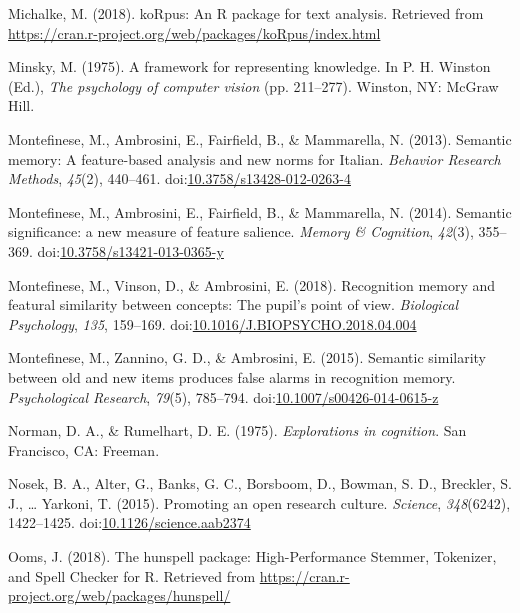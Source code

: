 \documentclass[man]{apa6}
\begin{document}
\leavevmode\hypertarget{ref-Michalke2018}{}%
Michalke, M. (2018). koRpus: An R package for text analysis. Retrieved from \url{https://cran.r-project.org/web/packages/koRpus/index.html}

\leavevmode\hypertarget{ref-Minsky1975}{}%
Minsky, M. (1975). A framework for representing knowledge. In P. H. Winston (Ed.), \emph{The psychology of computer vision} (pp. 211--277). Winston, NY: McGraw Hill.

\leavevmode\hypertarget{ref-Montefinese2013}{}%
Montefinese, M., Ambrosini, E., Fairfield, B., \& Mammarella, N. (2013). Semantic memory: A feature-based analysis and new norms for Italian. \emph{Behavior Research Methods}, \emph{45}(2), 440--461. doi:\href{https://doi.org/10.3758/s13428-012-0263-4}{10.3758/s13428-012-0263-4}

\leavevmode\hypertarget{ref-Montefinese2014}{}%
Montefinese, M., Ambrosini, E., Fairfield, B., \& Mammarella, N. (2014). Semantic significance: a new measure of feature salience. \emph{Memory \& Cognition}, \emph{42}(3), 355--369. doi:\href{https://doi.org/10.3758/s13421-013-0365-y}{10.3758/s13421-013-0365-y}

\leavevmode\hypertarget{ref-Montefinese2018}{}%
Montefinese, M., Vinson, D., \& Ambrosini, E. (2018). Recognition memory and featural similarity between concepts: The pupil's point of view. \emph{Biological Psychology}, \emph{135}, 159--169. doi:\href{https://doi.org/10.1016/J.BIOPSYCHO.2018.04.004}{10.1016/J.BIOPSYCHO.2018.04.004}

\leavevmode\hypertarget{ref-Montefinese2015}{}%
Montefinese, M., Zannino, G. D., \& Ambrosini, E. (2015). Semantic similarity between old and new items produces false alarms in recognition memory. \emph{Psychological Research}, \emph{79}(5), 785--794. doi:\href{https://doi.org/10.1007/s00426-014-0615-z}{10.1007/s00426-014-0615-z}

\leavevmode\hypertarget{ref-Norman1975}{}%
Norman, D. A., \& Rumelhart, D. E. (1975). \emph{Explorations in cognition}. San Francisco, CA: Freeman.

\leavevmode\hypertarget{ref-Nosek2015}{}%
Nosek, B. A., Alter, G., Banks, G. C., Borsboom, D., Bowman, S. D., Breckler, S. J., \ldots{} Yarkoni, T. (2015). Promoting an open research culture. \emph{Science}, \emph{348}(6242), 1422--1425. doi:\href{https://doi.org/10.1126/science.aab2374}{10.1126/science.aab2374}

\leavevmode\hypertarget{ref-Ooms2018}{}%
Ooms, J. (2018). The hunspell package: High-Performance Stemmer, Tokenizer, and Spell Checker for R. Retrieved from \url{https://cran.r-project.org/web/packages/hunspell/}
\end{document}
